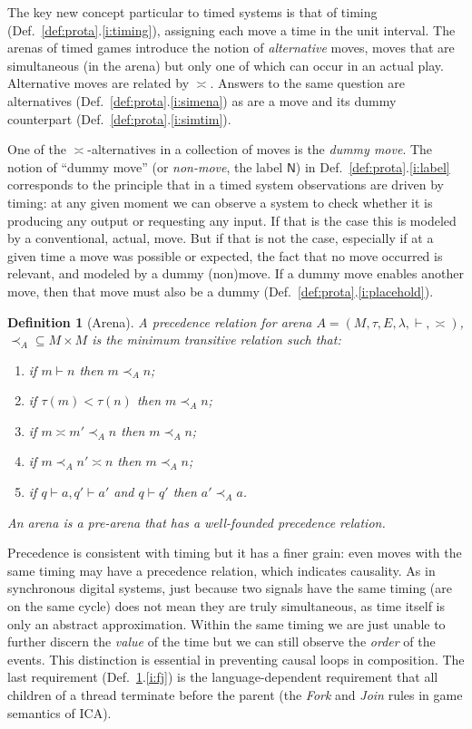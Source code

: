 \documentclass{article}
\newtheorem{definition}[theorem]{Definition}
\newcommand{\mv}[1]{\mathsf{#1}}
\begin{document}
The key new concept particular to timed systems is that of timing (Def.~\ref{def:prota}.\ref{i:timing}), assigning each move a time in the unit interval. The arenas of timed games introduce the notion of \emph{alternative} moves, moves that are simultaneous (in the arena) but only one of which can occur in an actual play. Alternative moves are related by $\asymp$. Answers to the same question are alternatives (Def.~\ref{def:prota}.\ref{i:simena}) as are a move and its dummy counterpart (Def.~\ref{def:prota}.\ref{i:simtim}). 

One of the $\asymp$-alternatives in a collection of moves is the \emph{dummy move}.
The notion of ``dummy move'' (or \emph{non-move}, the label $\mv N$) in Def.~\ref{def:prota}.\ref{i:label} corresponds to the principle that in a timed system observations are driven by timing: at any given moment we can observe a system to check whether it is producing any output or requesting any input. If that is the case this is modeled by a conventional, actual, move. But if that is not the case, especially if at a given time a move was possible or expected, the fact that no move occurred is relevant, and modeled by a dummy (non)move. If a dummy move enables another move, then that move must also be a dummy (Def.~\ref{def:prota}.\ref{i:placehold}). 

\begin{definition}[Arena]\label{def:arena}
	A \emph{precedence relation for arena} $A=(M,\tau,E,\lambda,\vdash,{\asymp})$, ${\prec_A}\subseteq M\times M$ is the minimum transitive relation such that:
\begin{enumerate}
\item if $m\vdash n$ then $m\prec_A n$;
\item if $\tau(m)<\tau(n)$ then $m\prec_A n$;\label{def:arenat}
\item if $m\asymp m' \prec_A n$ then $m\prec_A n$;
\item if $m\prec_A n'\asymp n$ then $m\prec_A n$;
\item \label{i:fj} if $q\vdash a,q'\vdash a'$ and $q\vdash q'$ then $a'\prec_A a$.
\end{enumerate}
	An \emph{arena} is a pre-arena that has a well-founded precedence relation. 
\end{definition}
Precedence is consistent with timing but it has a finer grain: even moves with the same timing may have a precedence relation, which indicates causality. As in synchronous digital systems, just because two signals have the same timing (are on the same cycle) does not mean they are truly simultaneous, as time itself is only an abstract approximation. Within the same timing we are just unable to further discern the \emph{value} of the time but we can still observe the \emph{order} of the events. This distinction is essential in preventing causal loops in composition. The last requirement (Def.~\ref{def:arena}.\ref{i:fj}) is the language-dependent requirement that all children of a thread terminate before the parent (the \emph{Fork} and \emph{Join} rules in game semantics of ICA).
\end{document}
